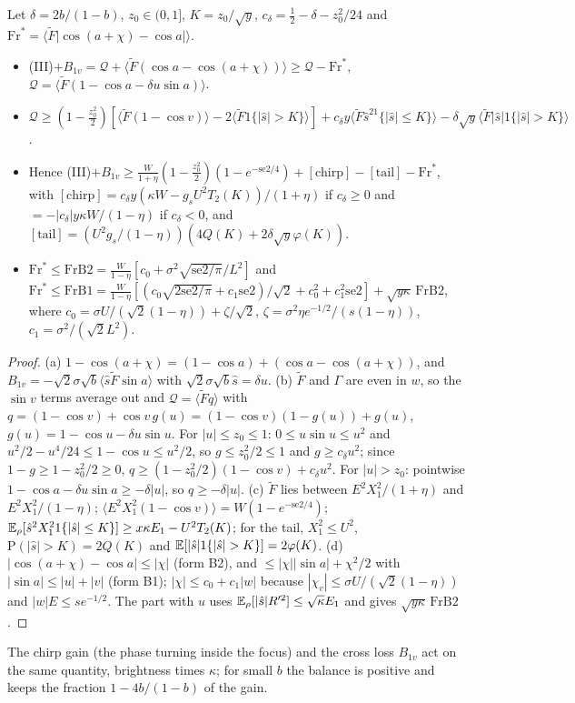 \begin{lemma}[pair] \proofst
\label{lem:CZ5}
Let $\delta=2b/(1-b)$, $z_0\in(0,1]$, $K=z_0/\sqrt y$, $c_\delta=\frac12-\delta-z_0^2/24$ and $\mathrm{Fr}^*=\langle\tilde F|\cos(a+\chi)-\cos a|\rangle$.
\begin{itemize}
\item[(a)] (III)$+B_{1v}=\mathcal Q+\langle\tilde F(\cos a-\cos(a+\chi))\rangle\ge\mathcal Q-\mathrm{Fr}^*$, $\mathcal Q=\langle\tilde F(1-\cos a-\delta u\sin a)\rangle$.
\item[(b)] $\mathcal Q\ge(1-\frac{z_0^2}2)[\langle\tilde F(1-\cos v)\rangle-2\langle\tilde F1\{|\hat s|>K\}\rangle]+c_\delta y\langle\tilde F\hat s^21\{|\hat s|\le K\}\rangle-\delta\sqrt y\langle\tilde F|\hat s|1\{|\hat s|>K\}\rangle$.
\item[(c)] Hence (III)$+B_{1v}\ge\frac W{1+\eta}(1-\frac{z_0^2}2)(1-e^{-\mathrm{se2}/4})+[\text{chirp}]-[\text{tail}]-\mathrm{Fr}^*$, with $[\text{chirp}]=c_\delta y(\kappa W-g_sU^2T_2(K))/(1+\eta)$ if $c_\delta\ge0$ and $=-|c_\delta|y\kappa W/(1-\eta)$ if $c_\delta<0$, and $[\text{tail}]=(U^2g_s/(1-\eta))(4Q(K)+2\delta\sqrt y\varphi(K))$.
\item[(d)] $\mathrm{Fr}^*\le\mathrm{FrB2}=\frac W{1-\eta}[c_0+\sigma^2\sqrt{\mathrm{se2}/\pi}/L^2]$ and $\mathrm{Fr}^*\le\mathrm{FrB1}=\frac W{1-\eta}[(c_0\sqrt{2\mathrm{se2}/\pi}+c_1\mathrm{se2})/\sqrt2+c_0^2+c_1^2\mathrm{se2}]+\sqrt{y\kappa}\,\mathrm{FrB2}$, where $c_0=\sigma U/(\sqrt2(1-\eta))+\zeta/\sqrt2$, $\zeta=\sigma^2\eta e^{-1/2}/(s(1-\eta))$, $c_1=\sigma^2/(\sqrt2L^2)$.
\end{itemize}
\end{lemma}
\begin{proof}
(a) $1-\cos(a+\chi)=(1-\cos a)+(\cos a-\cos(a+\chi))$, and $B_{1v}=-\sqrt2\sigma\sqrt b\langle\hat s\tilde F\sin a\rangle$ with $\sqrt2\sigma\sqrt b\hat s=\delta u$.
(b) $\tilde F$ and $\Gamma$ are even in $w$, so the $\sin v$ terms average out and $\mathcal Q=\langle\tilde Fq\rangle$ with $q=(1-\cos v)+\cos v\,g(u)=(1-\cos v)(1-g(u))+g(u)$, $g(u)=1-\cos u-\delta u\sin u$.
For $|u|\le z_0\le1$: $0\le u\sin u\le u^2$ and $u^2/2-u^4/24\le1-\cos u\le u^2/2$, so $g\le z_0^2/2\le1$ and $g\ge c_\delta u^2$; since $1-g\ge1-z_0^2/2\ge0$, $q\ge(1-z_0^2/2)(1-\cos v)+c_\delta u^2$.
For $|u|>z_0$: pointwise $1-\cos a-\delta u\sin a\ge-\delta|u|$, so $q\ge-\delta|u|$.
(c) $\tilde F$ lies between $E^2X_1^2/(1+\eta)$ and $E^2X_1^2/(1-\eta)$; $\langle E^2X_1^2(1-\cos v)\rangle=W(1-e^{-\mathrm{se2}/4})$; $\mathbb{E}_\rho[\hat s^2X_1^21\{|\hat s|\le K\}]\ge x\kappa E_1-U^2T_2(K)$; for the tail, $X_1^2\le U^2$, $\mathrm P(|\hat s|>K)=2Q(K)$ and $\E[|\hat s|1\{|\hat s|>K\}]=2\varphi(K)$.
(d) $|\cos(a+\chi)-\cos a|\le|\chi|$ (form B2), and $\le|\chi||\sin a|+\chi^2/2$ with $|\sin a|\le|u|+|v|$ (form B1); $|\chi|\le c_0+c_1|w|$ because $|\chi_v|\le\sigma U/(\sqrt2(1-\eta))$ and $|w|E\le se^{-1/2}$. The part with $u$ uses $\mathbb{E}_\rho[|\hat s|R'^2]\le\sqrt\kappa E_1$ and gives $\sqrt{y\kappa}\,\mathrm{FrB2}$.
\end{proof}
The chirp gain (the phase turning inside the focus) and the cross loss $B_{1v}$ act on the same quantity, brightness times $\kappa$; for small $b$ the balance is positive and keeps the fraction $1-4b/(1-b)$ of the gain.

